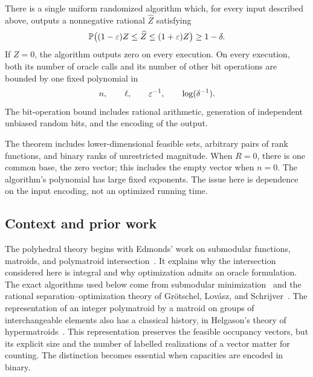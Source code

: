 \begin{theorem}\label{thm:main}
There is a single uniform randomized algorithm which, for every input
described above, outputs a nonnegative rational $\widehat Z$ satisfying
\[
 \mathbb P\bigl((1-\varepsilon)Z\le\widehat Z\le(1+\varepsilon)Z\bigr)
 \ge1-\delta.
\]
If $Z=0$, the algorithm outputs zero on every execution. On every
execution, both its number of oracle calls and its number of other bit
operations are bounded by one fixed polynomial in
\[
 n,\qquad \ell,\qquad \varepsilon^{-1},\qquad \log(\delta^{-1}).
\]
The bit-operation bound includes rational arithmetic, generation of
independent unbiased random bits, and the encoding of the output.
\end{theorem}

The theorem includes lower-dimensional feasible sets, arbitrary pairs
of rank functions, and binary ranks of unrestricted magnitude. When
$R=0$, there is one common base, the zero vector; this includes the empty
vector when $n=0$. The algorithm's polynomial has large fixed exponents.
The issue here is dependence on the input encoding, not an optimized
running time.

\subsection{Context and prior work}

The polyhedral theory begins with Edmonds' work on submodular functions,
matroids, and polymatroid intersection~\cite{Edmonds1970}. It explains
why the intersection considered here is integral and why optimization
admits an oracle formulation. The exact algorithms used below come from
submodular minimization~\cite{IFF2001} and the rational
separation--optimization theory of Gr{\"o}tschel, Lov{\'a}sz, and
Schrijver~\cite{GLS1988}. The representation of an integer polymatroid by
a matroid on groups of interchangeable elements also has a classical
history, in Helgason's theory of hypermatroids~\cite{Helgason1974}.
This representation preserves the feasible occupancy vectors, but its
explicit size and the number of labelled realizations of a vector matter
for counting. The distinction becomes essential when capacities are
encoded in binary.

